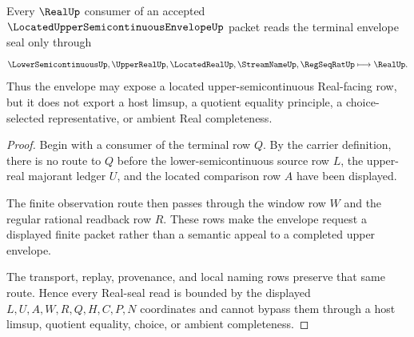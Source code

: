 \begin{theorem}
\label{thm:located-upper-semicontinuous-envelope-real-seal-boundary}
Every $\RealUp$ consumer of an accepted
$\LocatedUpperSemicontinuousEnvelopeUp$ packet reads the terminal envelope
seal only through
$$
\LowerSemicontinuousUp,\UpperRealUp,\LocatedRealUp,\StreamNameUp,\RegSeqRatUp
\longmapsto \RealUp.
$$
Thus the envelope may expose a located upper-semicontinuous Real-facing row,
but it does not export a host limsup, a quotient equality principle, a
choice-selected representative, or ambient Real completeness.
\end{theorem}
\begin{proof}
Begin with a consumer of the terminal row $Q$. By the carrier definition,
there is no route to $Q$ before the lower-semicontinuous source row $L$, the
upper-real majorant ledger $U$, and the located comparison row $A$ have been
displayed.

The finite observation route then passes through the window row $W$ and the
regular rational readback row $R$. These rows make the envelope request a
displayed finite packet rather than a semantic appeal to a completed
upper envelope.

The transport, replay, provenance, and local naming rows preserve that same
route. Hence every Real-seal read is bounded by the displayed
$L,U,A,W,R,Q,H,C,P,N$ coordinates and cannot bypass them through a host
limsup, quotient equality, choice, or ambient completeness.
\end{proof}




